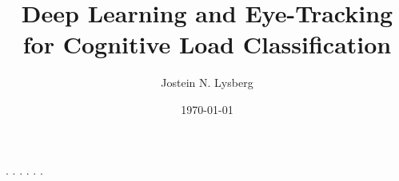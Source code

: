 \documentclass[american,titlepage]{ntnuthesis}
\title{Deep Learning and Eye-Tracking for Cognitive Load Classification}
\author{Jostein N. Lysberg}
\date{\today}
\begin{document}




\tableofcontents


\printnoidxglossaries

% 
% 

{.}
{.}
{.}
{.}
{.}
{.}
% 
% 
% 
% 

\chapter*{\bibname}
\printbibliography[heading=none]

\appendix

\end{document}
